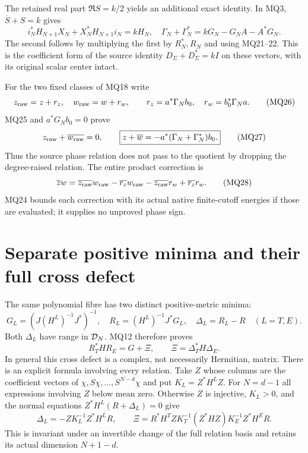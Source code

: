 \documentclass[11pt]{article}
\begin{document}
The retained real part $\Re S=k/2$ yields an additional exact
identity. In MQ3, $\overline S+S=k$ gives
\[
 i_N^*H_{N+1}X_N+X_N^*H_{N+1}i_N=kH_N,
 \quad
 \boxed{\Gamma_N+\Gamma_N^*=kG_N-G_NA-A^*G_N.}              \tag{MQ25}
\]
The second follows by multiplying the first by $R_N^*,R_N$ and
using MQ21--22. This is the coefficient form of the source identity
$D_\Sigma+D_\Sigma^*=kI$ on these vectors, with its original
scalar center intact.

For the two fixed classes of MQ18 write
\[
 z_{\rm raw}=z+r_z,\quad w_{\rm raw}=w+r_w,\qquad
 r_z=a^*\Gamma_Nb_0,\quad r_w=b_0^*\Gamma_Na.                \tag{MQ26}
\]
MQ25 and $a^*G_Nb_0=0$ prove
\[
 z_{\rm raw}+\overline{w_{\rm raw}}=0,\qquad
 \boxed{z+\overline w=-a^*(\Gamma_N+\Gamma_N^*)b_0.}         \tag{MQ27}
\]
Thus the source phase relation does not pass to the quotient by
dropping the degree-raised relation. The entire product correction is
\[
 \overline zw=\overline{z_{\rm raw}}w_{\rm raw}
     -\overline{r_z}w_{\rm raw}
     -\overline{z_{\rm raw}}r_w+\overline{r_z}r_w.            \tag{MQ28}
\]
MQ24 bounds each correction with its actual native finite-cutoff
energies if those are evaluated; it supplies no unproved phase sign.

\section{Separate positive minima and their full cross defect}
The same polynomial fibre has two distinct positive-metric minima:
\[
 G_L=(J(H^L)^{-1}J^*)^{-1},\quad
 R_L=(H^L)^{-1}J^*G_L,\quad \Delta_L=R_L-R\quad(L=T,E).
                                                               \tag{MQ29}
\]
Both $\Delta_L$ have range in $\mathcal D_N$. MQ12 therefore proves
\[
 R_T^*HR_E=G+\Xi,\qquad
 \boxed{\Xi=\Delta_T^*H\Delta_E.}                           \tag{MQ30}
\]
In general this cross defect is a complex, not necessarily Hermitian,
matrix. There is an explicit formula involving every relation.
Take $Z$ whose columns are the coefficient vectors of
$\chi,S\chi,\ldots,S^{N-d}\chi$ and put $K_L=Z^*H^LZ$.
For $N=d-1$ all expressions involving $Z$ below mean zero.
Otherwise $Z$ is injective, $K_L>0$, and the normal equations
$Z^*H^L(R+\Delta_L)=0$ give
\[
 \Delta_L=-ZK_L^{-1}Z^*H^LR,\qquad
 \Xi=R^*H^TZK_T^{-1}(Z^*HZ)K_E^{-1}Z^*H^ER.                \tag{MQ31}
\]
This is invariant under an invertible change of the full relation
basis and retains its actual dimension $N+1-d$.
\end{document}
